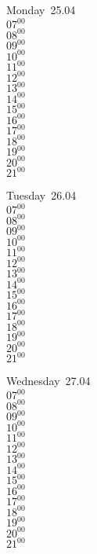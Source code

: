 \documentclass[11pt,a4paper]{book}\usepackage[]{graphicx}\usepackage[]{color}
\begin{document}
\begin{headerbox}
\end{headerbox}
\begin{weekdaybox}
  Monday~25.04\\
  { 
  \vfill
  $07^{00}$\\
$08^{00}$\\
$09^{00}$\\
$10^{00}$\\
$11^{00}$\\
$12^{00}$\\
$13^{00}$\\
$14^{00}$\\
$15^{00}$\\
$16^{00}$\\
$17^{00}$\\
$18^{00}$\\
$19^{00}$\\
$20^{00}$\\
$21^{00}$\\
  }
\end{weekdaybox}
\begin{weekdaybox}
  Tuesday~26.04\\
  { 
  \vfill
  $07^{00}$\\
$08^{00}$\\
$09^{00}$\\
$10^{00}$\\
$11^{00}$\\
$12^{00}$\\
$13^{00}$\\
$14^{00}$\\
$15^{00}$\\
$16^{00}$\\
$17^{00}$\\
$18^{00}$\\
$19^{00}$\\
$20^{00}$\\
$21^{00}$\\
  }
\end{weekdaybox}
\begin{weekdaybox}
  Wednesday~27.04\\
  { 
  \vfill
  $07^{00}$\\
$08^{00}$\\
$09^{00}$\\
$10^{00}$\\
$11^{00}$\\
$12^{00}$\\
$13^{00}$\\
$14^{00}$\\
$15^{00}$\\
$16^{00}$\\
$17^{00}$\\
$18^{00}$\\
$19^{00}$\\
$20^{00}$\\
$21^{00}$\\
  }
\end{weekdaybox}
\end{document}
